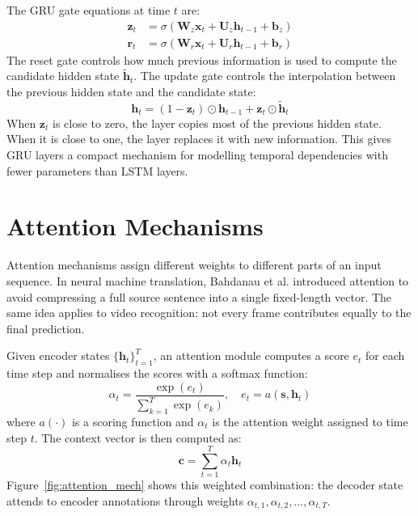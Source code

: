 The GRU gate equations at time $t$ are:
\begin{align}
    \mathbf{z}_t & = \sigma(\mathbf{W}_z\mathbf{x}_t + \mathbf{U}_z\mathbf{h}_{t-1} + \mathbf{b}_z) \\
    \mathbf{r}_t & = \sigma(\mathbf{W}_r\mathbf{x}_t + \mathbf{U}_r\mathbf{h}_{t-1} + \mathbf{b}_r)
\end{align}
The reset gate controls how much previous information is used to compute the candidate hidden state
$\tilde{\mathbf{h}}_t$. The update gate controls the interpolation between the previous hidden
state and the candidate state:
\begin{equation}
    \mathbf{h}_t = (1-\mathbf{z}_t)\odot\mathbf{h}_{t-1} + \mathbf{z}_t\odot\tilde{\mathbf{h}}_t
\end{equation}
When $\mathbf{z}_t$ is close to zero, the layer copies most of the previous hidden state. When it is
close to one, the layer replaces it with new information. This gives GRU layers a compact mechanism
for modelling temporal dependencies with fewer parameters than LSTM layers.

\section{Attention Mechanisms}
\label{sec:attention_mechanisms}

Attention mechanisms assign different weights to different parts of an input sequence. In neural
machine translation, Bahdanau et al. \cite{bahdanau2014neural} introduced attention to avoid
compressing a full source sentence into a single fixed-length vector. The same idea applies to
video recognition: not every frame contributes equally to the final prediction.

Given encoder states $\{\mathbf{h}_t\}_{t=1}^T$, an attention module computes a score $e_t$ for
each time step and normalises the scores with a softmax function:
\begin{equation}
    \alpha_t = \frac{\exp(e_t)}{\sum_{k=1}^{T}\exp(e_k)}, \quad e_t = a(\mathbf{s}, \mathbf{h}_t)
\end{equation}
where $a(\cdot)$ is a scoring function and $\alpha_t$ is the attention weight assigned to time step
$t$. The context vector is then computed as:
\begin{equation}
    \mathbf{c} = \sum_{t=1}^{T}\alpha_t\mathbf{h}_t
\end{equation}
Figure~\ref{fig:attention_mech} shows this weighted combination: the decoder state attends to
encoder annotations through weights $\alpha_{t,1},\alpha_{t,2},\ldots,\alpha_{t,T}$.

